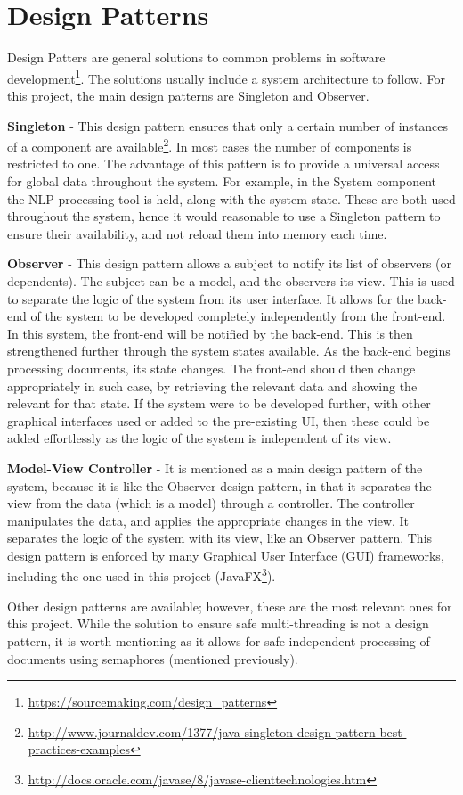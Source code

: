 \section{Design Patterns}
\par Design Patters are general solutions to common problems in software development\footnote{\url{https://sourcemaking.com/design_patterns}}. The solutions usually include a system architecture to follow. For this project, the main design patterns are Singleton and Observer.
\par \textbf{Singleton} - This design pattern ensures that only a certain number of instances of a component are available\footnote{\url{http://www.journaldev.com/1377/java-singleton-design-pattern-best-practices-examples}}. In most cases the number of components is restricted to one. The advantage of this pattern is to provide a universal access for global data throughout the system. For example, in the System component the NLP processing tool is held, along with the system state. These are both used throughout the system, hence it would reasonable to use a Singleton pattern to ensure their availability, and not reload them into memory each time.
\par \textbf{Observer} - This design pattern allows a subject to notify its list of observers (or dependents). The subject can be a model, and the observers its view. This is used to separate the logic of the system from its user interface. It allows for the back-end of the system to be developed completely independently from the front-end. In this system, the front-end will be notified by the back-end. This is then strengthened further through the system states available. As the back-end begins processing documents, its state changes. The front-end should then change appropriately in such case, by retrieving the relevant data and showing the relevant for that state. If the system were to be developed further, with other graphical interfaces used or added to the pre-existing UI, then these could be added effortlessly as the logic of the system is independent of its view.
\par \textbf{Model-View Controller} - It is mentioned as a main design pattern of the system, because it is like the Observer design pattern, in that it separates the view from the data (which is a model) through a controller. The controller manipulates the data, and applies the appropriate changes in the view. It separates the logic of the system with its view, like an Observer pattern. This design pattern is enforced by many Graphical User Interface (GUI) frameworks, including the one used in this project (JavaFX\footnote{\url{http://docs.oracle.com/javase/8/javase-clienttechnologies.htm}}). 
\par Other design patterns are available; however, these are the most relevant ones for this project. While the solution to ensure safe multi-threading is not a design pattern, it is worth mentioning as it allows for safe independent processing of documents using semaphores (mentioned previously). 


